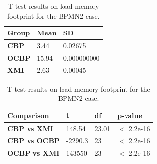 \documentclass{llncs}
\begin{document}
    \begin{table}[ht]
        \centering
        \label{table:ttest_load_memory_bpmn2}
        \caption{T-test results on load memory footprint for the BPMN2 case.}
        \begin{minipage}{0.44\textwidth}
            \centering
            \begin{tabular}{|p{}|p{}|p{}|}
                \hline 
                \textbf{Group}  & \textbf{Mean} & \textbf{SD} \\ 
                \hline 
                \textbf{CBP} & 3.44  & 0.02675 \\ 
                \hline 
                \textbf{OCBP} & 15.94 & 0.000000000  \\ 
                \hline 
                \textbf{XMI} & 2.63   & 0.00045\\ 
                \hline 
            \end{tabular} 
        \end{minipage}
        \hfill
        \begin{minipage}{0.54\textwidth}
            \centering
            \begin{tabular}{|p{}|p{}|p{}|p{}|}
                \hline 
                \textbf{Comparison} & \textbf{t}  & \textbf{df} & \textbf{p-value} \\ 
                \hline 
                \textbf{CBP vs XM}I & 148.54  & 23.01 & $<$ 2.2e-16 \\ 
                \hline 
                \textbf{CBP vs OCBP} & -2290.3 & 23 & $<$ 2.2e-16 \\ 
                \hline 
                \textbf{OCBP vs XMI} & 143550   & 23  & $<$ 2.2e-16 \\ 
                \hline 
            \end{tabular} 
        \end{minipage}
    \end{table}
    
\end{document}
